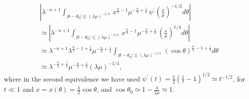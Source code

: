 \documentclass[11pt, reqno]{amsart}
\theoremstyle{plain}
\theoremstyle{remark}
\theoremstyle{example}
\theoremstyle{definition}
\numberwithin{equation}{section}
\begin{document}
\begin{equation*}\label{Purely Bessel1}
   \begin{split}
      &  \left| \lambda^{-n+1}  \int_{ | \theta - \theta_{0} | \lesssim  (\lambda \mu)^{-1/4}} \,   x^{\frac{n}{2}-1} \mu^{-\frac{n}{2}+\frac{1}{2}} \, \psi^{\prime}({\textstyle\frac{x}{\mu}})^{-1/2}      d \theta \right| \\
      & \simeq \left| \lambda^{-n+1}  \int_{ | \theta - \theta_{0} | \lesssim  (\lambda \mu)^{-1/4}} \,   x^{\frac{n}{2}-1} \mu^{-\frac{n}{2}+\frac{1}{2}} \, ({\textstyle\frac{x}{\mu}})^{1/4}      d \theta \right|\\
      & \simeq  \lambda^{-n+1} \lambda^{\frac{n}{2} -1 + \frac{1}{4}} \mu^{- \frac{n}{2} + \frac{1}{4}}  \int_{ | \theta - \theta_{0} | \lesssim  (\lambda \mu)^{-1/4}}  \, (\cos{\theta})^{\frac{n}{2}-1+\frac{1}{4}}      d \theta \\
      & \simeq   \lambda^{-\frac{n}{2} + \frac{1}{4}} \mu^{- \frac{n}{2} + \frac{1}{4}}  (\lambda \mu)^{-1/4},
   \end{split}
\end{equation*}
where in the second equivalence we have used $ \psi^{\prime}(t)= \frac{1}{2} \left(  \frac{1}{t} -1 \right)^{1/2} \simeq t^{-1/2}$, for $t \ll 1$ and $x= x(\theta)=\frac{\lambda}{2} \cos{\theta}$, and $\cos{\theta_{0}} \simeq 1 - \frac{\lambda}{2 \mu} \simeq 1$.
\end{document}
